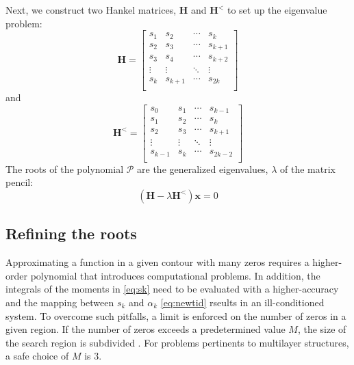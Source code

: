\documentclass[12pt]{article}
\begin{document}
%
Next, we construct two Hankel matrices, $\mathbf H$ and $\mathbf H^<$ to set up the eigenvalue problem:
%
\begin{equation}
  \mathbf H =
  \begin{bmatrix}
    s_1 & s_2 & \cdots & s_k \\
    s_2 & s_3 & \cdots & s_{k+1} \\
    s_3 & s_4 & \cdots & s_{k+2} \\
    \vdots & \vdots & \ddots & \vdots \\
    s_k & s_{k+1} & \cdots & s_{2k} \\
  \end{bmatrix}
  \label{eq:Hmat}
\end{equation}
%
and
%
\begin{equation}
  \mathbf H^< =
  \begin{bmatrix}
    s_0 & s_1 & \cdots & s_{k-1} \\
    s_1 & s_2 & \cdots & s_{k} \\
    s_2 & s_3 & \cdots & s_{k+1} \\
    \vdots & \vdots & \ddots & \vdots \\
    s_{k-1} & s_{k} & \cdots & s_{2k-2} \\
  \end{bmatrix}
  \label{eq:Hmat<}
\end{equation}
%
The roots of the polynomial $\mathcal P$ are the generalized eigenvalues, $\lambda$ of the matrix pencil:
%
\begin{equation}
  \left( \mathbf H - \lambda \mathbf H^< \right) \mathbf x = 0
  \label{eq:evp}
\end{equation}
%
\subsection{Refining the roots}

Approximating a function in a given contour with many zeros requires a higher-order polynomial that introduces computational problems. In addition, the integrals of the moments in \eqref{eq:sk} need to be evaluated with a higher-accuracy and the mapping between $s_k$ and $\alpha_k$ \eqref{eq:newtid} rseults in an ill-conditioned system. To overcome such pitfalls, a limit is enforced on the number of zeros in a given region. If the number of zeros exceeds a predetermined value $M$, the size of the search region is subdivided \cite{Delves1967c}. For problems pertinents to multilayer structures, a safe choice of $M$ is $3$.
\end{document}
